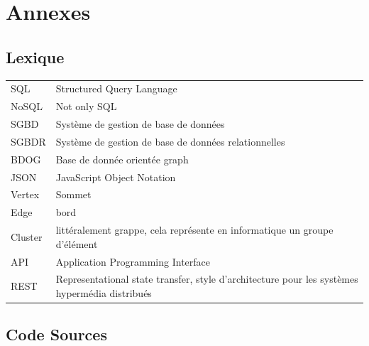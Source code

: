 \documentclass[a4paper,fleqn,12pt]{report}
\begin{document}
\part{Annexes}
\chapter*{Lexique}
\begin{center}
\begin{tabular}[c]{ l l }
 SQL  & Structured Query Language \\ 
 NoSQL  & Not only SQL \\ 
 SGBD  & Système de gestion de base de données \\ 
 SGBDR  & Système de gestion de base de données relationnelles \\ 
 BDOG  & Base de donnée orientée graph \\ 
 JSON  & JavaScript Object Notation \\ 
 Vertex  & Sommet \\ 
 Edge  & bord \\ 
 Cluster  & littéralement grappe, cela représente en informatique un groupe d'élément \\ 
 API  & Application Programming Interface  \\ 
 REST  & Representational state transfer, style d'architecture pour les systèmes hypermédia distribués \\ 
\end{tabular}
\end{center}

\chapter*{Code Sources}
\end{document}
